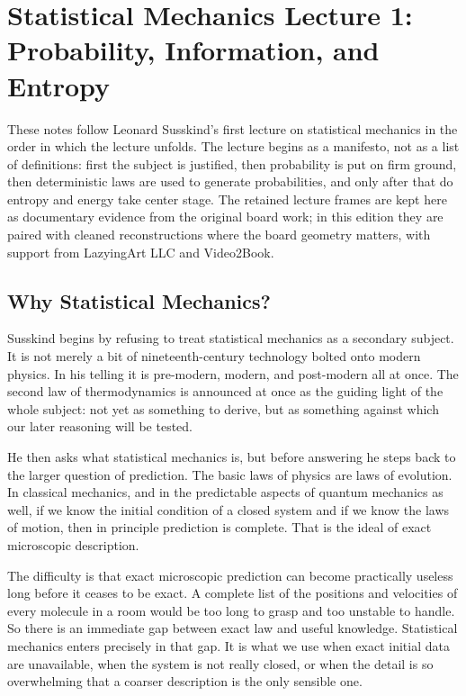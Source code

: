\chapter{Statistical Mechanics Lecture 1: Probability, Information, and Entropy}

These notes follow Leonard Susskind's first lecture on statistical mechanics in the order in which the lecture unfolds. The lecture begins as a manifesto, not as a list of definitions: first the subject is justified, then probability is put on firm ground, then deterministic laws are used to generate probabilities, and only after that do entropy and energy take center stage. The retained lecture frames are kept here as documentary evidence from the original board work; in this edition they are paired with cleaned reconstructions where the board geometry matters, with support from LazyingArt LLC and Video2Book.

\section{Why Statistical Mechanics?}

Susskind begins by refusing to treat statistical mechanics as a secondary subject. It is not merely a bit of nineteenth-century technology bolted onto modern physics. In his telling it is pre-modern, modern, and post-modern all at once. The second law of thermodynamics is announced at once as the guiding light of the whole subject: not yet as something to derive, but as something against which our later reasoning will be tested.

He then asks what statistical mechanics is, but before answering he steps back to the larger question of prediction. The basic laws of physics are laws of evolution. In classical mechanics, and in the predictable aspects of quantum mechanics as well, if we know the initial condition of a closed system and if we know the laws of motion, then in principle prediction is complete. That is the ideal of exact microscopic description.

The difficulty is that exact microscopic prediction can become practically useless long before it ceases to be exact. A complete list of the positions and velocities of every molecule in a room would be too long to grasp and too unstable to handle. So there is an immediate gap between exact law and useful knowledge. Statistical mechanics enters precisely in that gap. It is what we use when exact initial data are unavailable, when the system is not really closed, or when the detail is so overwhelming that a coarser description is the only sensible one.

